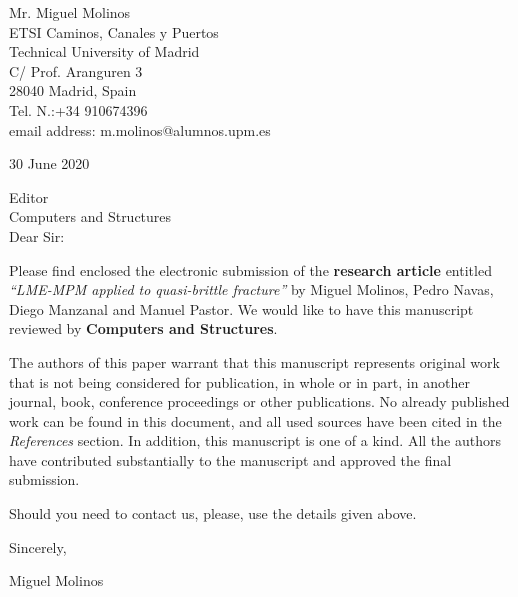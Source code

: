 \documentclass[10pt]{letter}
\begin{document}
Mr. Miguel Molinos\\
ETSI Caminos, Canales y Puertos\\
Technical University of Madrid\\
C/ Prof. Aranguren 3\\
28040 Madrid, Spain\\
Tel. N.:+34 910674396\\
email address: m.molinos@alumnos.upm.es\\

\vspace{.2in}

30 June 2020

\vspace{.3in}

Editor\\
Computers and Structures\\



Dear Sir:

\vspace{.2in}

Please find enclosed the electronic submission of the
\textbf{research article} entitled \textit{``LME-MPM applied to quasi-brittle fracture''} by Miguel Molinos, Pedro Navas, Diego Manzanal and Manuel Pastor. We would like to have this manuscript reviewed by \textbf{Computers and Structures}.

The authors of this paper warrant that this manuscript represents
original work that is not being considered for publication, in
whole or in part, in another journal, book, conference proceedings
or other publications. No already published work can be found in
this document, and all used sources have been cited in the
\textit{References} section. In addition, this manuscript is one
of a kind. All the authors have contributed substantially to the
manuscript and approved the final submission.

Should you need to contact us, please, use the details given above.



\vspace{.1in}

Sincerely,

\vspace{.3in}

Miguel Molinos
\end{document}
